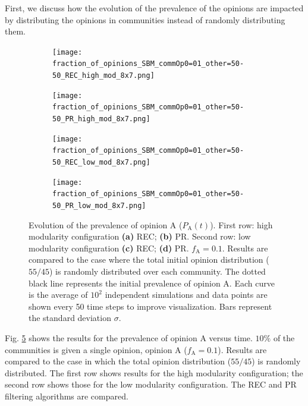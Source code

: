 \documentclass[11 pt , letterpaper , twoside , openright]{book}
\begin{document}
First, we discuss how the evolution of the prevalence of the opinions are impacted by distributing the opinions in communities instead of randomly distributing them.

\begin{figure}[H]
  \begin{subfigure}[b]{0.49\textwidth}
    \caption{}
  	\texttt{[image: fraction\_of\_opinions\_SBM\_commOp0=01\_other=50-50\_REC\_high\_mod\_8x7.png]}
    \label{high_mod_rec}
  \end{subfigure}
  \begin{subfigure}[b]{0.49\textwidth}
    \caption{}
  	\texttt{[image: fraction\_of\_opinions\_SBM\_commOp0=01\_other=50-50\_PR\_high\_mod\_8x7.png]}
    \label{high_mod_pr}
  \end{subfigure}
  \begin{subfigure}[b]{0.49\textwidth}
   \caption{}
    \texttt{[image: fraction\_of\_opinions\_SBM\_commOp0=01\_other=50-50\_REC\_low\_mod\_8x7.png]}
    \label{low_mod_rec}
  \end{subfigure}
  \begin{subfigure}[b]{0.49\textwidth}
    \caption{}
    \texttt{[image: fraction\_of\_opinions\_SBM\_commOp0=01\_other=50-50\_PR\_low\_mod\_8x7.png]}
    \label{low_mod_pr}
  \end{subfigure}
  \captionsetup{format=plain}
  \caption[Evolution of the prevalence of opinion A ($P_\text{A}(t)$). $10 \%$ of the communities is given a single opinion, opinion A, while the others get an initial $50/50$ opinion distribution. Results are compared to the case where the total initial opinion distribution ($55/45$) is randomly distributed over each community.]{Evolution of the prevalence of opinion A ($P_\text{A}(t)$). First row: high modularity configuration \textbf{(a)} REC; \textbf{(b)} PR. Second row: low modularity configuration \textbf{(c)} REC; \textbf{(d)} PR. $f_\text{A} = 0.1$. Results are compared to the case where the total initial opinion distribution ($55/45$) is randomly distributed over each community. The dotted black line represents the initial prevalence of opinion A. Each curve is the average of $10^2$ independent simulations and data points are shown every 50 time steps to improve visualization. Bars represent the standard deviation $\sigma$.}
\label{commOp0_01_other_50-50}
\end{figure}
\newpage
\noindent
Fig. \ref{commOp0_01_other_50-50} shows the results for the prevalence of opinion A versus time. $10 \%$ of the communities is given a single opinion, opinion A ($f_\text{A} = 0.1$). Results are compared to the case in which the total opinion distribution ($55/45$) is randomly distributed. The first row shows results for the high modularity configuration; the second row shows those for the low modularity configuration. The REC and PR filtering algorithms are compared.\\
\end{document}
